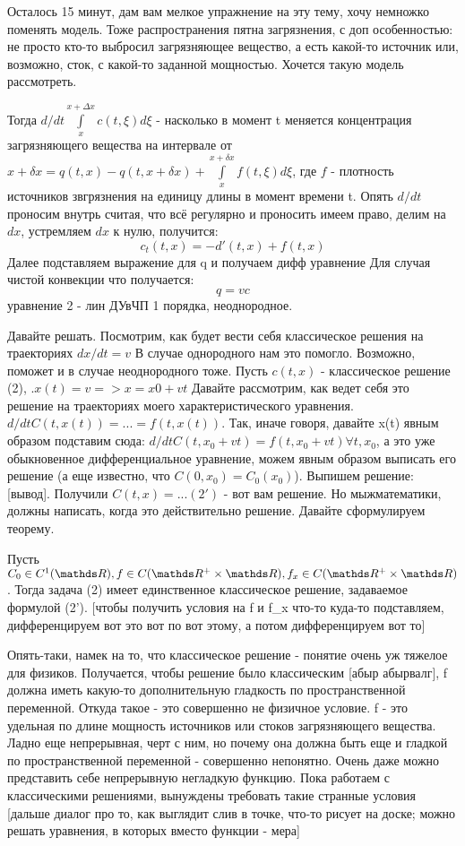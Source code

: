 Осталось 15 минут, дам вам мелкое упражнение на эту тему, хочу немножко поменять модель.
Тоже распространения пятна загрязнения, с доп особенностью: не просто кто-то выбросил загрязняющее вещество, а есть какой-то источник или, возможно, сток, с какой-то заданной мощностью. Хочется такую модель рассмотреть.

Тогда $d/dt \int \limits_x^{x + \Delta x} c(t, \xi ) d \xi$ - насколько в момент t меняется концентрация загрязняющего вещества на интервале от $x + \delta x = q(t, x) - q(t, x + \delta x) + \int \limits_x^{x+\delta x} f(t,\xi) d\xi$, где $f$ - плотность источников звгрязнения на единицу длины в момент времени t.
Опять $d/dt$ проносим внутрь считая, что всё регулярно и проносить имеем право, делим на $dx$, устремляем $dx$ к нулю, получится:
$$c_t(t,x) = -d'(t,x) + f(t, x)$$
Далее подставляем выражение для q и получаем дифф уравнение
Для случая чистой конвекции что получается:
$$q = vc$$
уравнение 2 - лин ДУвЧП 1 порядка, неоднородное.

Давайте решать. Посмотрим, как будет вести себя классическое решения на траекториях $dx/dt = v$
В случае однородного нам это помогло. Возможно, поможет и в случае неоднородного тоже.
Пусть $c(t,x)$ - классическое решение (2), .$x(t) = v => x = x0 + vt$
Давайте рассмотрим, как ведет себя это решение на траекториях моего характеристического уравнения. $d/dt C(t, x(t)) = ... = f (t, x(t))$. Так, иначе говоря, давайте x(t) явным образом подставим сюда: $d/dt C(t, x_0 + vt) = f(t, x_0 + vt) \forall t, x_0$, а это уже обыкновенное дифференциальное уравнение, можем явным образом выписать его решение (а еще известно, что $C(0, x_0) = C_0(x_0)$). Выпишем решение: [вывод]. Получили $C(t, x) = ... (2')$ - вот вам решение. Но мыжматематики, должны написать, когда это действительно решение. Давайте сформулируем теорему.

\begin{theorem}
Пусть $C_0 \in C^1(\real), f \in C(\real^+ \times \real), f_x \in C(\real^+ \times \real)$. Тогда задача (2) имеет единственное классическое решение, задаваемое формулой (2'). [чтобы получить условия на f и f_x что-то куда-то подставляем, дифференцируем вот это вот по вот этому, а потом дифференцируем вот то]
\end{theorem}

Опять-таки, намек на то, что классическое решение - понятие очень уж тяжелое для физиков. Получается, чтобы решение было классическим [абыр абырвалг], f должна иметь какую-то дополнительную гладкость по пространственной переменной. Откуда такое - это совершенно не физичное условие. f - это удельная по длине мощность источников или стоков загрязняющего вещества. Ладно еще непрерывная, черт с ним, но почему она должна быть еще и гладкой по пространственной переменной - совершенно непонятно. Очень даже можно представить себе непрерывную негладкую функцию. Пока работаем с классическими решениями, вынуждены требовать такие странные условия [дальше диалог про то, как выглядит слив в точке, что-то рисует на доске; можно решать уравнения, в которых вместо функции - мера]